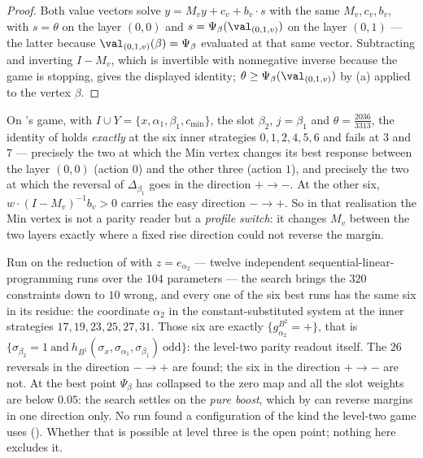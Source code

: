 \begin{proof}
Both value vectors solve $y=M_vy+c_v+b_v\cdot s$ with the same $M_v,c_v,b_v$,
with $s=\theta$ on the layer $(0,0)$ and $s=\Psi_\beta(\val_{(0,1,v)})$ on the
layer $(0,1)$ --- the latter because $\val_{(0,1,v)}(\beta)=\Psi_\beta$
evaluated at that same vector. Subtracting and inverting $I-M_v$, which is
invertible with nonnegative inverse because the game is stopping, gives the
displayed identity; $\theta\ge\Psi_\beta(\val_{(0,1,v)})$ by
(a) applied to the vertex $\beta$.
\end{proof}

\begin{remark}\label{b3:min-role}
On 's game, with $I\cup Y=\{x,\alpha_1,\beta_1,c_{\min}\}$,
the slot $\beta_2$, $j=\beta_1$ and $\theta=\tfrac{2036}{3313}$, the identity of
 holds \emph{exactly} at the six inner strategies
$0,1,2,4,5,6$ and fails at $3$ and $7$ --- precisely the two at which the Min
vertex changes its best response between the layer $(0,0)$ (action $0$) and the
other three (action $1$), and precisely the two at which the reversal of
$\Delta_{\beta_1}$ goes in the direction $+\to-$. At the other six,
$w\cdot(I-M_v)^{-1}b_v>0$ carries the easy direction $-\to+$. So in that
realisation the Min vertex is not a parity reader but a \emph{profile
switch}: it changes $M_v$ between the two layers exactly where a fixed rise
direction could not reverse the margin.
\end{remark}

\begin{remark}\label{b3:residue}
Run on the reduction of  with $z=e_{\alpha_2}$ --- twelve
independent sequential-linear-programming runs over the $104$ parameters ---
the search brings the $320$ constraints down to $10$ wrong, and every one of
the six best runs has the same six in its residue: the coordinate
$\alpha_2$ in the constant-substituted system at the inner strategies
$17,19,23,25,27,31$. Those six are exactly $\{g^{B^{2}}_{\alpha_2}=+\}$, that is
$\{\sigma_{\beta_2}=1\ \text{and}\ h_{B^{1}}(\sigma_x,\sigma_{\alpha_1},
\sigma_{\beta_1})\ \text{odd}\}$: the level-two parity readout itself. The
$26$ reversals in the direction $-\to+$ are found; the six in the direction
$+\to-$ are not. At the best point $\Psi_\beta$ has collapsed to the zero map
and all the slot weights are below $0.05$: the search settles on the
\emph{pure boost}, which by  can reverse margins in one
direction only. No run found a configuration of the kind the level-two game
uses (). Whether that is possible at level three is the open
point; nothing here excludes it.
\end{remark}

